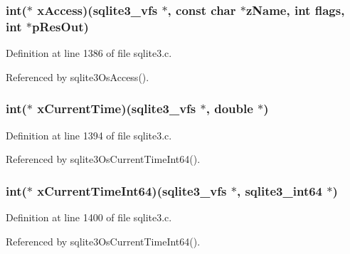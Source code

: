 \subsubsection[{x\+Access}]{\setlength{\rightskip}{0pt plus 5cm}int($\ast$ x\+Access)({\bf sqlite3\+\_\+vfs} $\ast$, const char $\ast${\bf z\+Name}, int flags, int $\ast$p\+Res\+Out)}\label{structsqlite3__vfs_abc25aba7356d962a9602b37f3b769001}


Definition at line 1386 of file sqlite3.\+c.



Referenced by sqlite3\+Os\+Access().

\hypertarget{structsqlite3__vfs_ad219f77cf376bde9d3c4cfd831116144}{}
\subsubsection[{x\+Current\+Time}]{\setlength{\rightskip}{0pt plus 5cm}int($\ast$ x\+Current\+Time)({\bf sqlite3\+\_\+vfs} $\ast$, double $\ast$)}\label{structsqlite3__vfs_ad219f77cf376bde9d3c4cfd831116144}


Definition at line 1394 of file sqlite3.\+c.



Referenced by sqlite3\+Os\+Current\+Time\+Int64().

\hypertarget{structsqlite3__vfs_a813afd045b5127c70a46991ad4b5ea9d}{}
\subsubsection[{x\+Current\+Time\+Int64}]{\setlength{\rightskip}{0pt plus 5cm}int($\ast$ x\+Current\+Time\+Int64)({\bf sqlite3\+\_\+vfs} $\ast$, {\bf sqlite3\+\_\+int64} $\ast$)}\label{structsqlite3__vfs_a813afd045b5127c70a46991ad4b5ea9d}


Definition at line 1400 of file sqlite3.\+c.



Referenced by sqlite3\+Os\+Current\+Time\+Int64().

\hypertarget{structsqlite3__vfs_a912173a4206a6fb4d7ae9e76420a8596}{}
